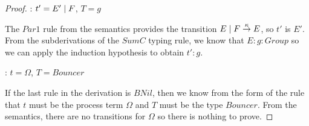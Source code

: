\begin{proof}
: $t' = E' \;|\; F$, $T = g$

\noindent The $Par1$ rule from the semantics provides the transition
$E \;|\; F \stackrel{\kappa}{\rightarrow} E$, so $t'$ is $E'$.  From the
subderivations of the $SumC$ typing rule, we know that $E : g : Group$
so we can apply the induction hypothesis to obtain $t' : g$.

\noindent 
{}: $t = \Omega$, $T = Bouncer$

\noindent If the last rule in the derivation is $BNil$, then we know
from the form of the rule that $t$ must be the process term $\Omega$
and $T$ must be the type $Bouncer$.  From the semantics, there are no
transitions for $\Omega$ so there is nothing to prove.

\end{proof}

